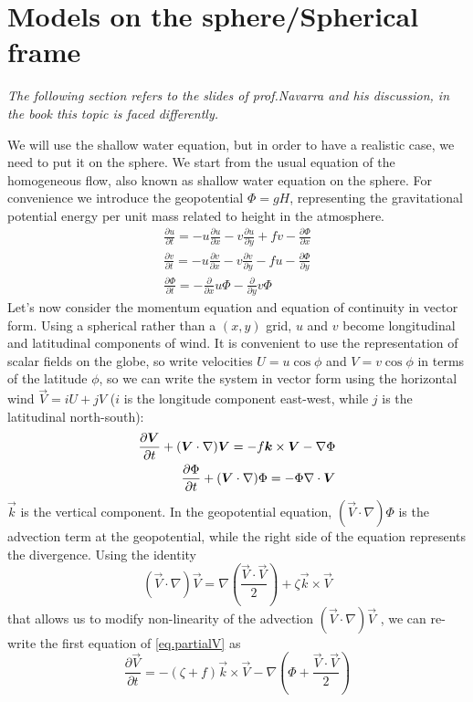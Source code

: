\section{Models on the sphere/Spherical frame}\label{Sec:models on the sphere}
\begin{center}
	\textit{The following section refers to the slides of prof.Navarra and his discussion, in the book this topic is faced differently.}
\end{center}
We will use the shallow water equation, but in order to have a realistic case, we need to put it on the sphere. We start from the usual equation of the homogeneous flow, also known as shallow water equation on the sphere. For convenience we introduce the geopotential $\Phi= gH$, representing the gravitational potential energy per unit mass related to height in the atmosphere.
\begin{align}
	\frac{\partial u}{\partial t}=-u\frac{\partial u}{\partial x}-v\frac{\partial u}{\partial y}+fv-\frac{\partial\Phi}{\partial x} \\
	\frac{\partial v}{\partial t}=-u\frac{\partial v}{\partial x}-v\frac{\partial v}{\partial y}-fu-\frac{\partial\Phi}{\partial y} \\
	\frac{\partial\Phi}{\partial t}=-\frac{\partial}{\partial x}u\Phi-\frac{\partial}{\partial y}v\Phi
\end{align}
Let's now consider the momentum equation and equation of continuity in vector form. Using a spherical rather than a $(x,y)$ grid, $u$ and $v$ become longitudinal and latitudinal components of wind. It is convenient to use the representation of scalar fields on the globe, so  write velocities $U=u\cos\phi$ and $V=v\cos\phi$ in terms of the latitude $\phi$, so we can write the system in vector form using the horizontal wind $\vec{V}=iU+jV$ ($i$ is the longitude component east-west, while $j$ is the latitudinal north-south):
\begin{align}\label{eq.partialV}
	\frac{\partial\vec{V}}{\partial t}+(\vec{V}\cdot\nabla)\vec{V}=-f\vec{k}\times\vec{V}-\nabla\Phi \\
	\frac{\partial\Phi}{\partial t}+(\vec{V}\cdot\nabla)\Phi=-\Phi\nabla\cdot\vec{V}\notag
\end{align}
$\vec{k}$ is the vertical component. In the geopotential equation, $(\vec{V}\cdot\nabla)\Phi$ is the advection term at the geopotential, while the right side of the equation represents the divergence.
Using the identity
$$(\vec{V}\cdot\nabla)\vec{V}=\nabla\left(\frac{\vec{V}\cdot\vec{V}}{2}\right)+\zeta\vec{k}\times\vec{V}$$
that allows us to modify non-linearity of the advection $(\vec{V}\cdot\nabla)\vec{V}$ , we can re-write the first equation of \ref{eq.partialV} as
\begin{equation}\label{eq.V}
	\frac{\partial\vec{V}}{\partial t}=-(\zeta+f)\vec{k}\times\vec{V}-\nabla\left(\Phi+\frac{\vec{V}\cdot\vec{V}}{2}\right)
\end{equation}


